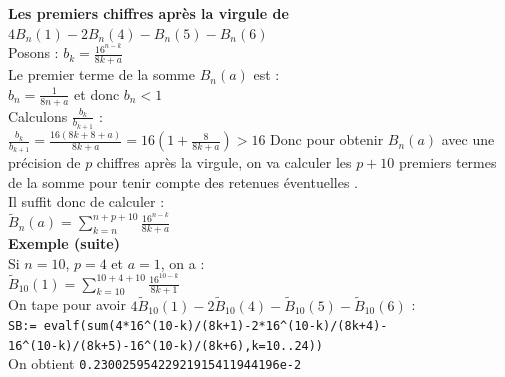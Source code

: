 \documentclass[a4paper,11pt]{book}
\begin{document}
\vspace{0.1cm}

{\bf Les premiers chiffres apr\`es la virgule de  $4B_{n}(1)-2B_{n}(4)-B_{n}(5)-B_{n}(6)$}\\
Posons : $b_k=\frac{16^{n-k}}{8k+a}$\\
Le premier terme de la somme $B_n(a)$ est :\\
$b_n=\frac{1}{8n+a}$ et donc $b_n<1$\\
Calculons $\frac{b_k}{b_{k+1}}$ :\\
$\frac{b_k}{b_{k+1}}=\frac{16(8k+8+a)}{8k+a}=16(1+\frac{8}{8k+a})>16$
Donc pour obtenir $B_n(a)$ avec une pr\'ecision de $p$ chiffres apr\`es la
virgule, on va calculer les $p+10$ premiers termes de la somme pour tenir compte
des retenues \'eventuelles .\\
Il suffit donc de calculer :\\
$\tilde{B}_n(a)=\sum_{k=n}^{n+p+10} \frac{16^{n-k}}{8k+a}$\\
{\bf Exemple (suite)}\\
Si $n=10$, $p=4$ et $a=1$, on a :\\
$\tilde{B}_{10}(1)=\sum_{k=10}^{10+4+10} \frac{16^{10-k}}{8k+1}$\\
On tape  pour avoir $4\tilde{B}_{10}(1)-2\tilde{B}_{10}(4)-\tilde{B}_{10}(5)-\tilde{B}_{10}(6)$ :\\
{\tt SB:= evalf(sum(4*16\verb|^|(10-k)/(8k+1)-2*16\verb|^|(10-k)/(8k+4)-\\16\verb|^|(10-k)/(8k+5)-16\verb|^|(10-k)/(8k+6),k=10..24))}\\
On obtient
{\tt 0.23002595422921915411944196e-2}
\end{document}
